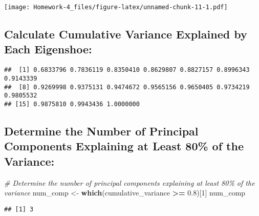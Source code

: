 \documentclass[
]{article}
\newenvironment{Shaded}{\begin{snugshade}}{\end{snugshade}}
\newcommand{\CommentTok}[1]{\textcolor[rgb]{0.56,0.35,0.01}{\textit{#1}}}
\newcommand{\DecValTok}[1]{\textcolor[rgb]{0.00,0.00,0.81}{#1}}
\newcommand{\FloatTok}[1]{\textcolor[rgb]{0.00,0.00,0.81}{#1}}
\newcommand{\FunctionTok}[1]{\textcolor[rgb]{0.13,0.29,0.53}{\textbf{#1}}}
\newcommand{\NormalTok}[1]{#1}
\newcommand{\OtherTok}[1]{\textcolor[rgb]{0.56,0.35,0.01}{#1}}
\newcommand{\SpecialCharTok}[1]{\textcolor[rgb]{0.81,0.36,0.00}{\textbf{#1}}}
\begin{document}
\texttt{[image: Homework-4\_files/figure-latex/unnamed-chunk-11-1.pdf]}

\hypertarget{calculate-cumulative-variance-explained-by-each-eigenshoe}{%
\subsection{Calculate Cumulative Variance Explained by Each
Eigenshoe:}\label{calculate-cumulative-variance-explained-by-each-eigenshoe}}

\begin{Shaded}
\end{Shaded}

\begin{verbatim}
##  [1] 0.6833796 0.7836119 0.8350410 0.8629807 0.8827157 0.8996343 0.9143339
##  [8] 0.9269998 0.9375131 0.9474672 0.9565156 0.9650405 0.9734219 0.9805532
## [15] 0.9875810 0.9943436 1.0000000
\end{verbatim}

\hypertarget{determine-the-number-of-principal-components-explaining-at-least-80-of-the-variance}{%
\subsection{Determine the Number of Principal Components Explaining at
Least 80\% of the
Variance:}\label{determine-the-number-of-principal-components-explaining-at-least-80-of-the-variance}}

\begin{Shaded}
\begin{Highlighting}[]
\CommentTok{\# Determine the number of principal components explaining at least 80\% of the variance}
\NormalTok{num\_comp }\OtherTok{\textless{}{-}} \FunctionTok{which}\NormalTok{(cumulative\_variance }\SpecialCharTok{\textgreater{}=} \FloatTok{0.8}\NormalTok{)[}\DecValTok{1}\NormalTok{]}
\NormalTok{num\_comp}
\end{Highlighting}
\end{Shaded}

\begin{verbatim}
## [1] 3
\end{verbatim}
\end{document}
